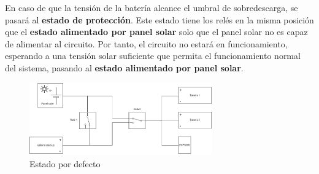 En caso de que la tensión de la batería alcance el umbral de sobredescarga, se pasará al \textbf{estado de protección}. Este estado tiene los relés en la misma posición que el \textbf{estado alimentado por panel solar} solo que el panel solar no es capaz de alimentar al circuito. Por tanto, el circuito no estará en funcionamiento, esperando a una tensión solar suficiente que permita el funcionamiento normal del sistema, pasando al \textbf{estado alimentado por panel solar}.

\begin{figure}[H]
    \centering
    \includegraphics[width=0.7\textwidth]{images/2-hardware/Estado_defecto.png}
    \caption{Estado por defecto}
    \label{fig:hardware/estados/defecto}
\end{figure}
